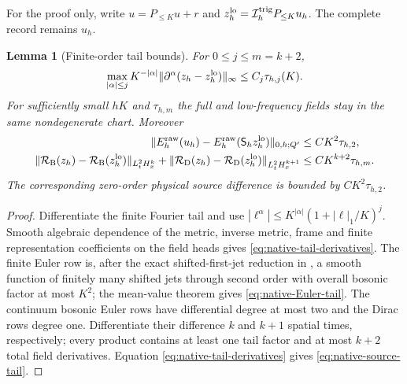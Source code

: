 \documentclass[11pt]{article}
\numberwithin{equation}{section}
\newtheorem{lemma}[lemma]{Lemma}
\theoremstyle{definition}
\theoremstyle{remark}
\newcommand{\norm}[1]{\lVert#1\rVert}
\begin{document}
For the proof only, write $u=P_{\le K}u+r$ and $z_h^{\rm lo}=\mathcal I_h^{\rm trig}P_{\le K}u_h$.  The complete record remains $u_h$.

\begin{lemma}[Finite-order tail bounds]
\label{lem:native-tail-transfer}
For $0\le j\le m=k+2$,
\begin{equation}
 \max_{|\alpha|\le j}K^{-|\alpha|}\norm{\partial^\alpha(z_h-z_h^{\rm lo})}_\infty
 \le C_j\tau_{h,j}(K).
 \label{eq:native-tail-derivatives}
\end{equation}
For sufficiently small $hK$ and $\tau_{h,m}$ the full and low-frequency fields stay in the same nondegenerate chart.  Moreover
\begin{align}
 \norm{E_h^{\rm raw}(u_h)-E_h^{\rm raw}(\mathsf S_hz_h^{\rm lo})}_{0,h;Q'}
 &\le CK^2\tau_{h,2},\label{eq:native-Euler-tail}\\
 \norm{\mathcal R_{\rm B}(z_h)-\mathcal R_{\rm B}(z_h^{\rm lo})}_{L^2_tH_x^k}
 +\norm{\mathcal R_{\rm D}(z_h)-\mathcal R_{\rm D}(z_h^{\rm lo})}_{L^2_tH_x^{k+1}}
 &\le CK^{k+2}\tau_{h,m}.\label{eq:native-source-tail}
\end{align}
The corresponding zero-order physical source difference is bounded by $CK^2\tau_{h,2}$.
\end{lemma}
\begin{proof}
Differentiate the finite Fourier tail and use
$|\ell^\alpha|\le K^{|\alpha|}(1+|\ell|_1/K)^j$.  Smooth algebraic dependence of the metric, inverse metric, frame and finite representation coefficients on the field heads gives \eqref{eq:native-tail-derivatives}.  The finite Euler row is, after the exact shifted-first-jet reduction in , a smooth function of finitely many shifted jets through second order with overall bosonic factor at most $K^2$; the mean-value theorem gives \eqref{eq:native-Euler-tail}.  The continuum bosonic Euler rows have differential degree at most two and the Dirac rows degree one.  Differentiate their difference $k$ and $k+1$ spatial times, respectively; every product contains at least one tail factor and at most $k+2$ total field derivatives.  Equation \eqref{eq:native-tail-derivatives} gives \eqref{eq:native-source-tail}.
\end{proof}
\end{document}
